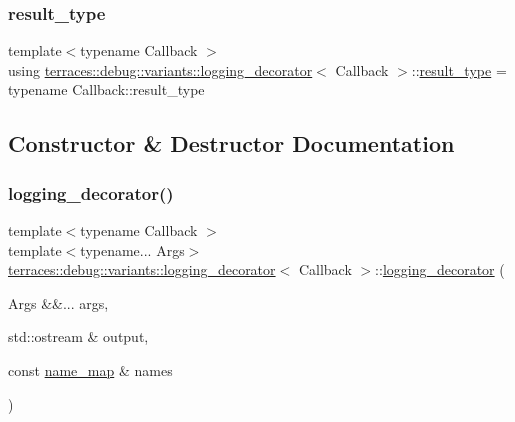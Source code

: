 \subsubsection{\texorpdfstring{result\+\_\+type}{result\_type}}
{\footnotesize\ttfamily template$<$typename Callback $>$ \\
using \hyperlink{classterraces_1_1debug_1_1variants_1_1logging__decorator}{terraces\+::debug\+::variants\+::logging\+\_\+decorator}$<$ Callback $>$\+::\hyperlink{classterraces_1_1debug_1_1variants_1_1logging__decorator_a7c08c8ede1f8c884a3bab0437b244f55}{result\+\_\+type} =  typename Callback\+::result\+\_\+type}



\subsection{Constructor \& Destructor Documentation}
\mbox{\label{classterraces_1_1debug_1_1variants_1_1logging__decorator_a6e9f97ef90017d53d69241a9b827014e}} 
\subsubsection{\texorpdfstring{logging\+\_\+decorator()}{logging\_decorator()}}
{\footnotesize\ttfamily template$<$typename Callback $>$ \\
template$<$typename... Args$>$ \\
\hyperlink{classterraces_1_1debug_1_1variants_1_1logging__decorator}{terraces\+::debug\+::variants\+::logging\+\_\+decorator}$<$ Callback $>$\+::\hyperlink{classterraces_1_1debug_1_1variants_1_1logging__decorator}{logging\+\_\+decorator} (\begin{DoxyParamCaption}\item[{Args \&\&...}]{args,  }\item[{std\+::ostream \&}]{output,  }\item[{const \hyperlink{namespaceterraces_a4ef0217fe5aed881737d9bc5a8d45dca}{name\+\_\+map} \&}]{names }\end{DoxyParamCaption})\hspace{0.3cm}{\ttfamily [inline]}}



